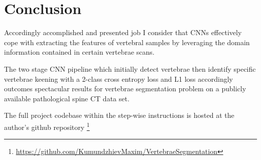 \chapter{Conclusion}
\label{ch:conclusion}
Accordingly  accomplished and presented job I consider that CNNs effectively cope with extracting the features of vertebral samples by leveraging the domain information contained in certain vertebrae scans.

The two stage CNN pipeline which initially detect vertebrae then identify specific vertebrae keening with a 2-class cross entropy loss and L1 loss accordingly outcomes spectacular results for vertebrae segmentation problem on a publicly available pathological spine CT data set. 

The full project codebase within the step-wise instructions is hosted at the author's github repository \footnote{ \url{https://github.com/KumundzhievMaxim/VertebraeSegmentation}}